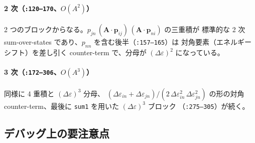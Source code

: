 \documentclass[dvipdfmx,a4paper,11pt]{jsarticle}
\newcommand{\file}[1]{\texttt{#1}}
\newcommand{\vA}{\bm{A}}
\newcommand{\vp}{\bm{p}}
\newcommand{\eps}{\varepsilon}
\begin{document}
\paragraph{2 次（\file{:120--170}、$O(A^2)$）}
2 つのブロックからなる。$p_{jn}\,(\vA\cdot\vp_{ij})\,(\vA\cdot\vp_{ni})$ の三重積が
標準的な 2 次 sum-over-states であり、$p_{nn}$ を含む後半（\file{:157--165}）は
対角要素（エネルギーシフト）を差し引く counter-term で、分母が
$(\Delta\eps)^2$ になっている。

\paragraph{3 次（\file{:172--306}、$O(A^3)$）}
同様に 4 重積と $(\Delta\eps)^3$ 分母、
$(\Delta\eps_{in} + \Delta\eps_{jn}) / (2\,\Delta\eps_{in}^2\,\Delta\eps_{jn}^2)$
の形の対角 counter-term、最後に \verb|sum1| を用いた $(\Delta\eps)^3$ ブロック
（\file{:275--305}）が続く。

\subsection{デバッグ上の要注意点}
\end{document}
